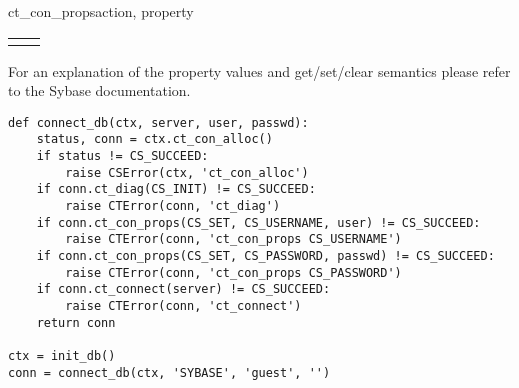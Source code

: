 \begin{methoddesc}[CS_CONNECTION]{ct_con_props}{action, property }
\begin{longtable}{l|l}
\code{CS_EED_CMD}              & \code{CS_COMMAND} \\
\end{longtable}

For an explanation of the property values and get/set/clear semantics
please refer to the Sybase documentation.

\begin{verbatim}
def connect_db(ctx, server, user, passwd):
    status, conn = ctx.ct_con_alloc()
    if status != CS_SUCCEED:
        raise CSError(ctx, 'ct_con_alloc')
    if conn.ct_diag(CS_INIT) != CS_SUCCEED:
        raise CTError(conn, 'ct_diag')
    if conn.ct_con_props(CS_SET, CS_USERNAME, user) != CS_SUCCEED:
        raise CTError(conn, 'ct_con_props CS_USERNAME')
    if conn.ct_con_props(CS_SET, CS_PASSWORD, passwd) != CS_SUCCEED:
        raise CTError(conn, 'ct_con_props CS_PASSWORD')
    if conn.ct_connect(server) != CS_SUCCEED:
        raise CTError(conn, 'ct_connect')
    return conn

ctx = init_db()
conn = connect_db(ctx, 'SYBASE', 'guest', '')
\end{verbatim}
\end{methoddesc}

